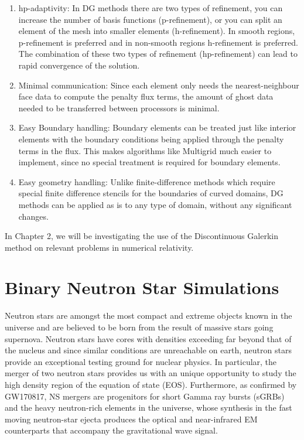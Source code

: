 \begin{enumerate}
\item hp-adaptivity: In DG methods there are two types of refinement, you can increase the number of basis functions (p-refinement), or you can split an element of the mesh into smaller elements (h-refinement). In smooth regions, p-refinement is preferred and in non-smooth regions h-refinement is preferred. The combination of these two types of refinement (hp-refinement) can lead to rapid convergence of the solution.
\item Minimal communication: Since each element only needs the nearest-neighbour face data to compute the penalty flux terms, the amount of ghost data needed to be transferred between processors is minimal.
\item Easy Boundary handling: Boundary elements can be treated just like interior elements with the boundary conditions being applied through the penalty terms in the flux. This makes algorithms like Multigrid much easier to implement, since no special treatment is required for boundary elements.
\item Easy geometry handling: Unlike finite-difference methods which require special finite difference stencils for the boundaries of curved domains, DG methods can be applied as is to any type of domain, without any significant changes.
\end{enumerate}

In Chapter 2, we will be investigating the use of the Discontinuous Galerkin method on relevant problems in numerical relativity.

\section{Binary Neutron Star Simulations}

Neutron stars are amongst the most compact and extreme objects known in
the universe and are believed to be born from the result of
massive stars going supernova. Neutron stars have cores with densities exceeding far beyond that
of the nucleus and since similar conditions are unreachable on earth, neutron stars provide an exceptional testing ground for nuclear physics. In particular, the merger of two neutron stars provides us with an unique opportunity to study the high density region of the equation of state (EOS). Furthermore, as confirmed by GW170817, NS mergers are progenitors for short Gamma ray bursts (sGRBs) and the
heavy neutron-rich elements in the universe, whose synthesis in the fast moving neutron-star ejecta produces the optical and near-infrared EM counterparts that accompany the gravitational wave signal.

